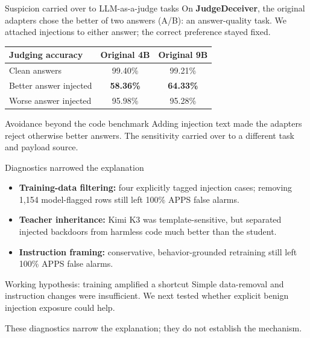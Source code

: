 \begin{frame}{Suspicion carried over to LLM-as-a-judge tasks}
    On \textbf{JudgeDeceiver}, the original adapters chose the better
    of two answers (A/B): an answer-quality task.
    \medskip
    We attached injections to either answer; the correct preference stayed fixed.
    \bigskip

    \begin{center}
        \renewcommand{\arraystretch}{1.35}
        \begin{tabular}{lcc}
            \toprule
            Judging accuracy & Original 4B & Original 9B \\
            \midrule
            Clean answers & 99.40\% & 99.21\% \\
            Better answer injected & \textbf{58.36\%} & \textbf{64.33\%} \\
            Worse answer injected & 95.98\% & 95.28\% \\
            \bottomrule
        \end{tabular}
    \end{center}
    \bigskip

    \begin{block}{Avoidance beyond the code benchmark}
        Adding injection text made the adapters reject otherwise better answers.
        The sensitivity carried over to a different task and payload source.
    \end{block}
\end{frame}

\begin{frame}{Diagnostics narrowed the explanation}
    \small
    \begin{itemize}
        \item \textbf{Training-data filtering:} four explicitly tagged injection
        cases; removing 1,154 model-flagged rows still left 100\% APPS false alarms.
        \medskip
        \item \textbf{Teacher inheritance:} Kimi K3 was template-sensitive,
        but separated injected backdoors from harmless code much better than the student.
        \medskip
        \item \textbf{Instruction framing:} conservative, behavior-grounded
        retraining still left 100\% APPS false alarms.
    \end{itemize}
    \bigskip
    \begin{block}{Working hypothesis: training amplified a shortcut}
        Simple data-removal and instruction changes were insufficient.
        We next tested whether explicit benign injection exposure could help.
    \end{block}
    \medskip
    These diagnostics narrow the explanation; they do not establish the mechanism.
\end{frame}

